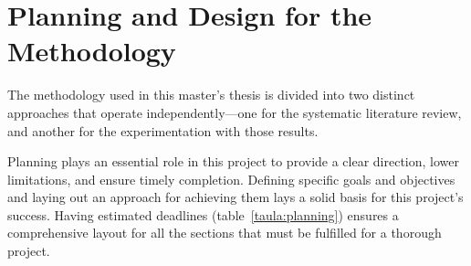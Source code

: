 \documentclass[a4paper,12pt,twoside]{ThesisStyle}
\begin{document}
\chapter{Planning and Design for the Methodology}
\label{cap:plan}

The methodology used in this master's thesis is divided into two distinct approaches that operate independently—one for the systematic literature review, and another for the experimentation with those results. 

Planning plays an essential role in this project to provide a clear direction, lower limitations, and ensure timely completion. Defining specific goals and objectives and laying out an approach for achieving them lays a solid basis for this project's success. Having estimated deadlines (table~\ref{taula:planning}) ensures a comprehensive layout for all the sections that must be fulfilled for a thorough project. 
\end{document}
